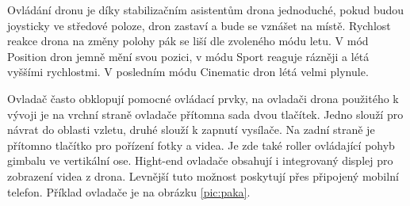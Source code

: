Ovládání dronu je díky stabilizačním asistentům drona jednoduché, pokud budou joysticky ve středové poloze, dron zastaví a bude se vznášet na místě. Rychlost reakce drona na změny polohy pák se liší dle zvoleného módu letu. V mód Position dron jemně mění svou pozici, v módu Sport reaguje rázněji a létá vyššími rychlostmi. V posledním módu Cinematic dron létá velmi plynule.

Ovladač často obklopují pomocné ovládací prvky, na ovladači drona použitého k vývoji je na vrchní straně ovladače přítomna sada dvou tlačítek. Jedno slouží pro návrat do oblasti vzletu, druhé slouží k zapnutí vysílače. Na zadní straně je přítomno tlačítko pro pořízení fotky a videa. Je zde také roller ovládající pohyb gimbalu ve vertikální ose. Hight-end ovladače obsahují i integrovaný displej pro zobrazení videa z drona. Levnější tuto možnost poskytují přes připojený mobilní telefon. Příklad ovladače je na obrázku \ref{pic:paka}.
